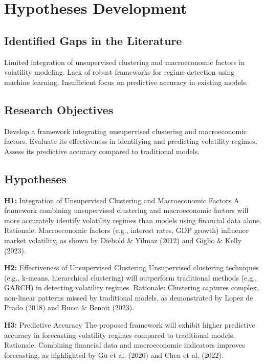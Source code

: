 \chapter{Hypotheses Development}

\section{Identified Gaps in the Literature}
Limited integration of unsupervised clustering and macroeconomic factors in volatility modeling.
Lack of robust frameworks for regime detection using machine learning.
Insufficient focus on predictive accuracy in existing models.

\section{Research Objectives}
Develop a framework integrating unsupervised clustering and macroeconomic factors.
Evaluate its effectiveness in identifying and predicting volatility regimes.
Assess its predictive accuracy compared to traditional models.

\section{Hypotheses}

\textbf{H1:} Integration of Unsupervised Clustering and Macroeconomic Factors
A framework combining unsupervised clustering and macroeconomic factors will more accurately identify volatility regimes than models using financial data alone.
Rationale: Macroeconomic factors (e.g., interest rates, GDP growth) influence market volatility, as shown by Diebold \& Yilmaz (2012) \cite{diebold_yilmaz_2012} and Giglio \& Kelly (2023).

\textbf{H2:} Effectiveness of Unsupervised Clustering
Unsupervised clustering techniques (e.g., k-means, hierarchical clustering) will outperform traditional methods (e.g., GARCH) in detecting volatility regimes.
Rationale: Clustering captures complex, non-linear patterns missed by traditional models, as demonstrated by Lopez de Prado (2018) and Bucci & Benoit (2023).

\textbf{H3:} Predictive Accuracy
The proposed framework will exhibit higher predictive accuracy in forecasting volatility regimes compared to traditional models.
Rationale: Combining financial data and macroeconomic indicators improves forecasting, as highlighted by Gu et al. (2020) and Chen et al. (2022).

